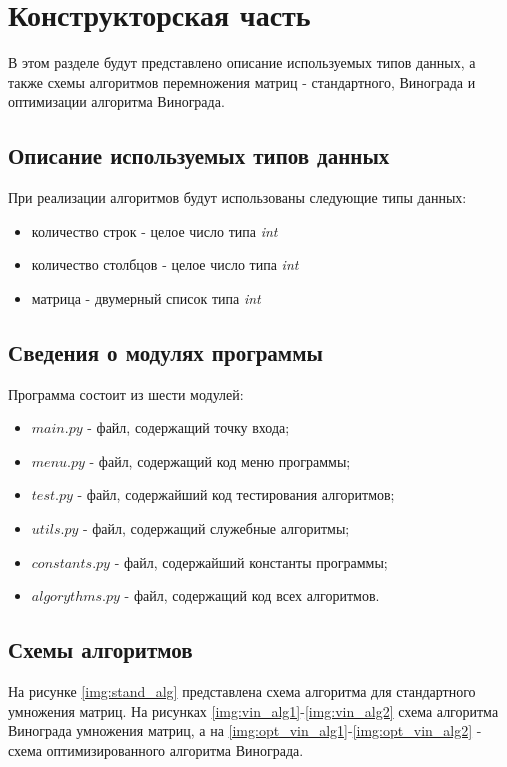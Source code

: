 \chapter{Конструкторская часть}
В этом разделе будут представлено описание используемых типов данных, а также схемы алгоритмов перемножения матриц - стандартного, Винограда и оптимизации алгоритма Винограда.

\section{Описание используемых типов данных}

При реализации алгоритмов будут использованы следующие типы данных:

\begin{itemize}
	\item количество строк - целое число типа \textit{int}
	\item количество столбцов - целое число типа \textit{int}
	\item матрица - двумерный список типа \textit{int}
\end{itemize}


\section{Сведения о модулях программы}
Программа состоит из шести модулей:
\begin{itemize}
	\item $main.py$ - файл, содержащий точку входа;
    \item $menu.py$ - файл, содержащий код меню программы;
    \item $test.py$ - файл, содержайший код тестирования алгоритмов;
    \item $utils.py$ - файл, содержащий служебные алгоритмы;
    \item $constants.py$ - файл, содержайший константы программы;
    \item $algorythms.py$ - файл, содержащий код всех алгоритмов. \newline
\end{itemize}

\section{Схемы алгоритмов}
На рисунке \ref{img:stand_alg} представлена схема алгоритма для стандартного умножения матриц. На рисунках \ref{img:vin_alg1}-\ref{img:vin_alg2} схема алгоритма Винограда умножения матриц, а на \ref{img:opt_vin_alg1}-\ref{img:opt_vin_alg2} - схема оптимизированного алгоритма Винограда.

